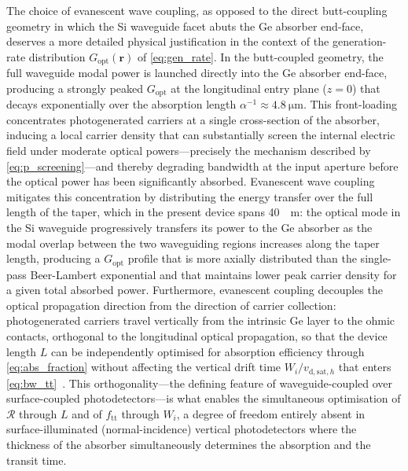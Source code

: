 The choice of evanescent wave coupling, as opposed to the direct butt-coupling
geometry in which the Si waveguide facet abuts the Ge absorber end-face, deserves
a more detailed physical justification in the context of the generation-rate
distribution $G_{\mathrm{opt}}(\mathbf{r})$ of \cref{eq:gen_rate}. In the
butt-coupled geometry, the full waveguide modal power is launched directly into
the Ge absorber end-face, producing a strongly peaked $G_{\mathrm{opt}}$ at the
longitudinal entry plane ($z = 0$) that decays exponentially over the absorption
length $\alpha^{-1} \approx \SI{4.8}{\micro\metre}$. This front-loading
concentrates photogenerated carriers at a single cross-section of the absorber,
inducing a local carrier density that can substantially screen the internal
electric field under moderate optical powers—precisely the mechanism described
by \cref{eq:p_screening}—and thereby degrading bandwidth at the input aperture
before the optical power has been significantly absorbed. Evanescent wave
coupling mitigates this concentration by distributing the energy transfer over
the full length of the taper, which in the present device spans \SI{40}{\micro
\metre}: the optical mode in the Si waveguide progressively transfers its power
to the Ge absorber as the modal overlap between the two waveguiding regions
increases along the taper length, producing a $G_{\mathrm{opt}}$ profile that
is more axially distributed than the single-pass Beer-Lambert exponential and
that maintains lower peak carrier density for a given total absorbed power.
Furthermore, evanescent coupling decouples the optical propagation direction
from the direction of carrier collection: photogenerated carriers travel
vertically from the intrinsic Ge layer to the ohmic contacts, orthogonal to
the longitudinal optical propagation, so that the device length $L$ can be
independently optimised for absorption efficiency through \cref{eq:abs_fraction}
without affecting the vertical drift time $W_i/v_{\mathrm{d,sat},h}$ that
enters \cref{eq:bw_tt}~\cite{Wang2024,Yan2024}. This orthogonality—the defining
feature of waveguide-coupled over surface-coupled photodetectors—is what enables
the simultaneous optimisation of $\mathcal{R}$ through $L$ and of
$f_{\mathrm{tt}}$ through $W_i$, a degree of freedom entirely absent in
surface-illuminated (normal-incidence) vertical photodetectors where the
thickness of the absorber simultaneously determines the absorption and the
transit time.



